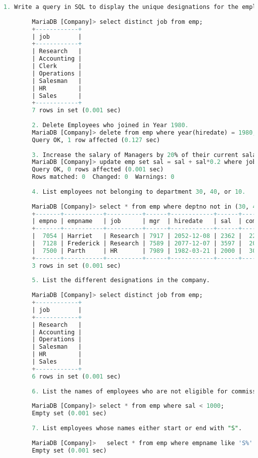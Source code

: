 \documentclass{article}
\begin{document}
	\begin{lstlisting}[language=SQL] 
		1. Write a query in SQL to display the unique designations for the employees. 
		
		MariaDB [Company]> select distinct job from emp; 
		+------------+ 
		| job        | 
		+------------+ 
		| Research   | 
		| Accounting | 
		| Clerk      | 
		| Operations | 
		| Salesman   | 
		| HR         | 
		| Sales      | 
		+------------+ 
		7 rows in set (0.001 sec) 
		
		2. Delete Employees who joined in Year 1980. 
		MariaDB [Company]> delete from emp where year(hiredate) = 1980; 
		Query OK, 1 row affected (0.127 sec) 
		
		3. Increase the salary of Managers by 20% of their current salary. 
		MariaDB [Company]> update emp set sal = sal + sal*0.2 where job = 'Manager'; 
		Query OK, 0 rows affected (0.001 sec) 
		Rows matched: 0  Changed: 0  Warnings: 0 
		
		4. List employees not belonging to department 30, 40, or 10. 
		
		MariaDB [Company]> select * from emp where deptno not in (30, 40, 10); 
		+-------+-----------+----------+------+------------+------+------+--------+ 
		| empno | empname   | job      | mgr  | hiredate   | sal  | comm | deptno | 
		+-------+-----------+----------+------+------------+------+------+--------+ 
		|  7054 | Harriet   | Research | 7917 | 2052-12-08 | 2362 |  229 |     20 | 
		|  7128 | Frederick | Research | 7589 | 2077-12-07 | 3597 |  203 |     20 | 
		|  7500 | Parth     | HR       | 7989 | 1982-03-21 | 2000 |  300 |     60 | 
		+-------+-----------+----------+------+------------+------+------+--------+ 
		3 rows in set (0.001 sec) 
		
		5. List the different designations in the company. 
		
		MariaDB [Company]> select distinct job from emp; 
		+------------+ 
		| job        | 
		+------------+ 
		| Research   | 
		| Accounting | 
		| Operations | 
		| Salesman   | 
		| HR         | 
		| Sales      | 
		+------------+ 
		6 rows in set (0.001 sec) 
		
		6. List the names of employees who are not eligible for commission. 
		
		MariaDB [Company]> select * from emp where sal < 1000; 
		Empty set (0.001 sec) 
		
		7. List employees whose names either start or end with "S". 
		
		MariaDB [Company]>   select * from emp where empname like 'S%' or empname like '%S'; 
		Empty set (0.001 sec) 
		

\end{lstlisting}
\end{document}
